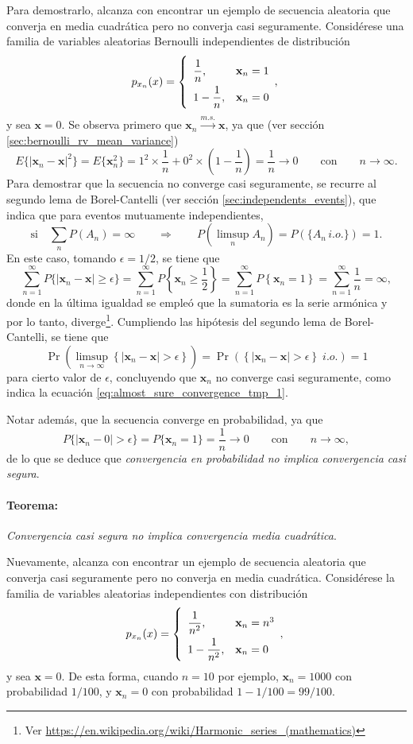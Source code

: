 \documentclass[a4paper]{report}
\newcommand{\x}{\mathbf{x}}
\begin{document}
Para demostrarlo, alcanza con encontrar un ejemplo de secuencia aleatoria que converja en media cuadrática pero no converja casi seguramente.
Considérese una familia de variables aleatorias Bernoulli independientes de distribución
\[\def\arraystretch{2.0}
 p_{x_n}(x)=
 \left\{\begin{array}{ll}
  \dfrac{1}{n}, & \x_n=1\\
  1-\dfrac{1}{n}, & \x_n=0
 \end{array}, \right.
\]
y sea \(\x=0\). Se observa primero que \(\x_n\overset{m.s.}{\longrightarrow}\x\), ya que (ver sección \ref{sec:bernoulli_rv_mean_variance})
\[
  E\{|\x_n-\x|^2\}=E\{\x_n^2\}=1^2\times \frac{1}{n}+0^2\times \left(1-\frac{1}{n}\right)=\frac{1}{n}\to0\qquad\textrm{con}\qquad n\to\infty.
\]
Para demostrar que la secuencia no converge casi seguramente, se recurre al segundo lema de Borel-Cantelli (ver sección \ref{sec:independents_events}), que indica que para eventos mutuamente independientes, 
\[
 \textrm{si}\quad \sum_n P(A_n)=\infty\qquad\Rightarrow\qquad P\left(\limsup_n A_n\right) = P(\{A_n\,i.o.\})=1.
\]
En este caso, tomando \(\epsilon=1/2\), se tiene que
\[
 \sum_{n=1}^\infty P\{|\x_n-\x|\geq\epsilon\}=\sum_{n=1}^\infty P\left\{\x_n\geq\frac{1}{2}\right\}
 =\sum_{n=1}^\infty P\left\{\x_n=1\right\}
 =\sum_{n=1}^\infty \frac{1}{n}
 =\infty,
\]
donde en la última igualdad se empleó que la sumatoria es la serie armónica y por lo tanto, diverge\footnote{Ver \url{https://en.wikipedia.org/wiki/Harmonic_series_(mathematics)}}. Cumpliendo las hipótesis del segundo lema de Borel-Cantelli, se tiene que
\[
  \Pr\left(\limsup_{n\to\infty}\left\{|\x_n-\x|>\epsilon \right\}\right)=\Pr\left(\left\{|\x_n-\x|>\epsilon \right\}\;i.o.\right)=1
\]
para cierto valor de \(\epsilon\), concluyendo que \(\x_n\) no converge casi seguramente, como indica la ecuación \ref{eq:almost_sure_convergence_tmp_1}.

Notar además, que la secuencia converge en probabilidad, ya que
\[
 P\{|\x_n-0|>\epsilon\}=P\{\x_n=1\}=\frac{1}{n}\to0\qquad\textrm{con}\qquad n\to\infty,
\]
de lo que se deduce que \emph{convergencia en probabilidad no implica convergencia casi segura}.


\paragraph{Teorema:} \emph{Convergencia casi segura no implica convergencia media cuadrática}. 

Nuevamente, alcanza con encontrar un ejemplo de secuencia aleatoria que converja casi seguramente pero no converja en media cuadrática.
Considérese la familia de variables aleatorias independientes con distribución
\[\def\arraystretch{2.0}
 p_{x_n}(x)=
 \left\{\begin{array}{ll}
  \dfrac{1}{n^2}, & \x_n=n^3\\
  1-\dfrac{1}{n^2}, & \x_n=0
 \end{array}, \right.
\]
y sea \(\x=0\). De esta forma, cuando \(n=10\) por ejemplo, \(\x_n=1000\) con probabilidad \(1/100\), y \(\x_n=0\) con probabilidad \(1-1/100=99/100\).
\end{document}
